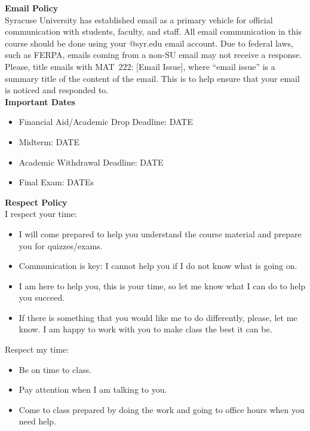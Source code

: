 \documentclass[11pt,letterpaper]{article}
\newcommand{\lefthead}[2]{\noindent\textbf{#1}\hfill\\[#2]}
\begin{document}
\lefthead{Email Policy}{0.3cm}
\noindent Syracuse University has established email as a primary vehicle for official communication with students, faculty, and staff. All email communication in this course should be done using your @syr.edu email account. Due to federal laws, such as FERPA, emails coming from a non-SU email may not receive a response. Please, title emails with MAT~222: [Email Issue], where ``email issue'' is a summary title of the content of the email. This is to help ensure that your email is noticed and responded to. \\[0.3cm]





\lefthead{Important Dates}{0cm}
	\begin{itemize}
	\item Financial Aid/Academic Drop Deadline: DATE
	\item Midterm: DATE
	\item Academic Withdrawal Deadline: DATE
	\item Final Exam: DATEs \\
	\end{itemize}





\lefthead{Respect Policy}{0cm}
\noindent I respect your time:
\begin{itemize}
\item I will come prepared to help you understand the course material and prepare you for quizzes/exams.
\item Communication is key: I cannot help you if I do not know what is going on.
\item I am here to help you, this is your time, so let me know what I can do to help you succeed.
\item If there is something that you would like me to do differently, please, let me know. I am happy to work with you to make class the best it can be.
\end{itemize}

\noindent Respect my time:
\begin{itemize}
\item Be on time to class.
\item Pay attention when I am talking to you.
\item Come to class prepared by doing the work and going to office hours when you need help.
\end{itemize}
\end{document}
